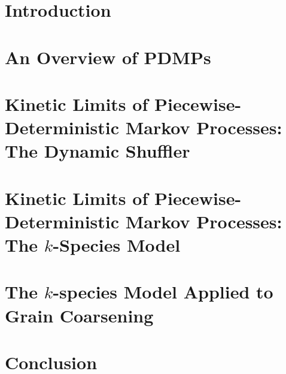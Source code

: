 \documentclass[12pt]{report}   %
\begin{document}
\pagestyle{myheadings}

\newtheorem{lem}{Lemma}
\newtheorem{deef}{Definition}
\newtheorem{theorem}{Theorem}
\newtheorem{rem}{Remark}

\chapter{Introduction}

\clearpage{\pagestyle{empty}\cleardoublepage}

\chapter{An Overview of PDMPs}

\clearpage{\pagestyle{empty}\cleardoublepage}

\chapter{Kinetic Limits of Piecewise-Deterministic Markov Processes: The Dynamic Shuffler}

\clearpage{\pagestyle{empty}\cleardoublepage}

\chapter{Kinetic Limits of Piecewise-Deterministic Markov Processes: The $k$-Species Model}

\clearpage{\pagestyle{empty}\cleardoublepage}


\chapter{The $k$-species Model Applied to Grain Coarsening}

\clearpage{\pagestyle{empty}\cleardoublepage}



\chapter{Conclusion}

\clearpage{\pagestyle{empty}\cleardoublepage}

% 


% 



\begin{spacing}{0.9}
  
\end{spacing}
\end{document}
